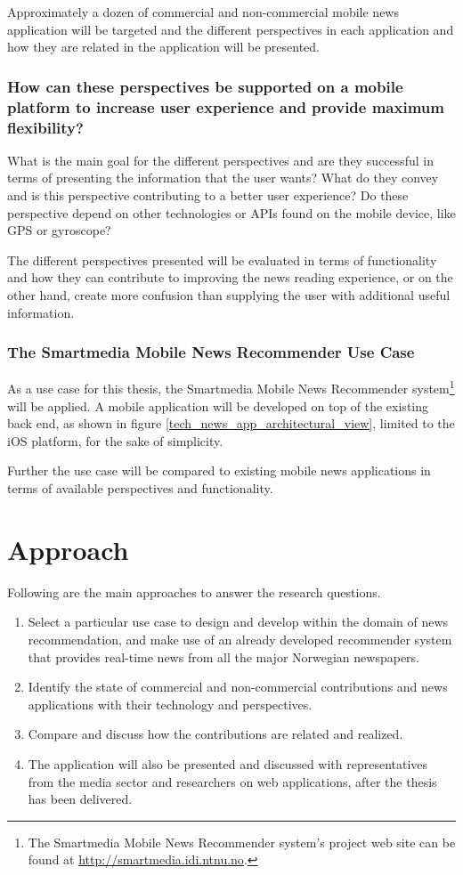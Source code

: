 Approximately a dozen of commercial and non-commercial mobile news application will be targeted and the different perspectives in each application and how they are related in the application will be presented.


\subsubsection{How can these perspectives be supported on a mobile platform to increase user experience and provide maximum flexibility?}

What is the main goal for the different perspectives and are they successful in terms of presenting the information that the user wants? What do they convey and is this perspective contributing to a better user experience? Do these perspective depend on other technologies or APIs found on the mobile device, like GPS or gyroscope?

The different perspectives presented will be evaluated in terms of functionality and how they can contribute to improving the news reading experience, or on the other hand, create more confusion than supplying the user with additional useful information.


\subsubsection{The Smartmedia Mobile News Recommender Use Case}
As a use case for this thesis, the Smartmedia Mobile News Recommender system\footnote{The Smartmedia Mobile News Recommender system's project web site can be found at \url{http://smartmedia.idi.ntnu.no}.} will be applied. A mobile application will be developed on top of the existing back end, as shown in figure \ref{tech_news_app_architectural_view}, limited to the iOS platform, for the sake of simplicity.

Further the use case will be compared to existing mobile news applications in terms of available perspectives and functionality.

\section{Approach}
Following are the main approaches to answer the research questions.

\begin{enumerate}
	\item Select a particular use case to design and develop within the domain of news recommendation, and make use of an already developed recommender system that provides real-time news from all the major Norwegian newspapers.
	\item Identify the state of commercial and non-commercial contributions and news applications with their technology and perspectives.
	\item Compare and discuss how the contributions are related and realized.
	\item The application will also be presented and discussed with representatives from the media sector and researchers on web applications, after the thesis has been delivered.
\end{enumerate}


